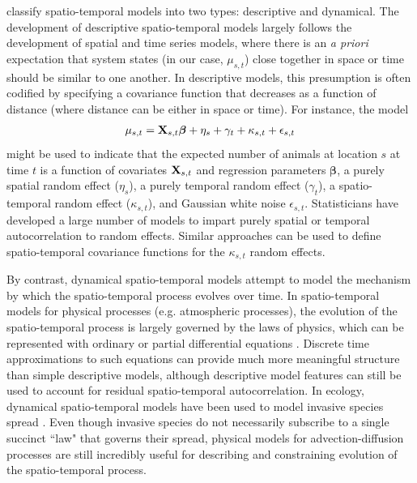 \documentclass[times,mee,doublespace,]{besauth2}
\begin{document}
\citet{CressieWikle2011} classify spatio-temporal models into two types: descriptive and dynamical.  The development of descriptive spatio-temporal models largely follows the development of spatial and time series models, where there is an {\it a priori} expectation that system states (in our case, $\mu_{s,t}$) close together in space or time should be similar to one another.  In descriptive models, this presumption is often codified by specifying a covariance function that decreases as a function of distance (where distance can be either in space or time).  For instance, the model
\begin{eqnarray}
  \mu_{s,t} = {\bf X}_{s,t} \boldsymbol{\beta} + \eta_s + \gamma_t + \kappa_{s,t} + \epsilon_{s,t} \label{eq:glmm}
\end{eqnarray}
might be used to indicate that the expected number of animals at location $s$ at time $t$ is a function of covariates ${\bf X}_{s,t}$ and regression parameters $\boldsymbol{\beta}$, a purely spatial random effect ($\eta_s$), a purely temporal random effect ($\gamma_t$), a spatio-temporal random effect ($\kappa_{s,t}$), and Gaussian white noise $\epsilon_{s,t}$.  Statisticians have developed a large number of models to impart purely spatial \citep[e.g. geostatistical models, Gaussian Markov random fields (GMRFs); see e.g.][]{Cressie1993,BanerjeeEtAl2004,RueHeld2005} or temporal \citep[e.g. AR(p) processes and ARIMA models;][]{BoxEtAl2008,PradoWest2010} autocorrelation to random effects.
Similar approaches can be used to define spatio-temporal covariance functions \citep{CressieWikle2011} for the $\kappa_{s,t}$ random effects.

By contrast, dynamical spatio-temporal models attempt to model the mechanism by which the spatio-temporal process evolves over time.  In spatio-temporal models for physical processes (e.g. atmospheric processes), the evolution of the spatio-temporal process is largely governed by the laws of physics, which can be represented with ordinary or partial differential equations \citep{WikleEtAl2001,WikleHooten2010}.  Discrete time approximations to such equations can provide much more meaningful structure than simple descriptive models, although descriptive model features can still be used to account for residual spatio-temporal autocorrelation.  In ecology, dynamical spatio-temporal models have been used to model invasive species spread \citep{Wikle2003,HootenEtAl2007,HootenWikle2008}.  Even though invasive species do not necessarily subscribe to a single succinct ``law" that governs their spread, physical models for advection-diffusion processes are still incredibly useful for describing and constraining evolution of the spatio-temporal process.
\end{document}
